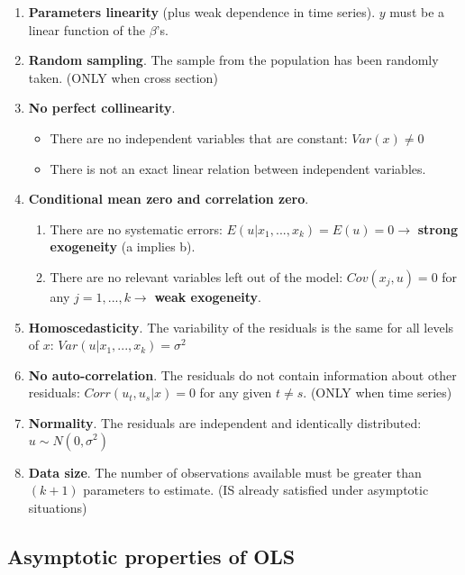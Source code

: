 \documentclass[10pt, a4paper, landscape]{extarticle}
\begin{document}
\begin{multicols}{3}
\begin{enumerate}[leftmargin=*]
\item \textbf{Parameters linearity} (plus weak dependence in time series). $y$ must be a linear function of the $\beta$'s.
\item \textbf{Random sampling}. The sample from the population has been randomly taken. (ONLY when cross section)
\item \textbf{No perfect collinearity}.
\begin{itemize}[leftmargin=*]
\item There are no independent variables that are constant: $Var(x) \neq 0$
\item There is not an exact linear relation between independent variables.
\end{itemize}
\item \textbf{Conditional mean zero and correlation zero}.
\begin{enumerate}[leftmargin=*, label=\alph*.]
\item There are no systematic errors: $E(u | x_1, ..., x_k) = E(u) = 0 \rightarrow$ \textbf{strong exogeneity} (a implies b).
\item There are no relevant variables left out of the model: $Cov(x_j , u) = 0$ for any $j = 1, ..., k \rightarrow$ \textbf{weak exogeneity}.
\end{enumerate}
\item \textbf{Homoscedasticity}. The variability of the residuals is the same for all levels of $x$: $Var(u | x_1, ..., x_k) = \sigma^2$
\item \textbf{No auto-correlation}. The residuals do not contain information about other residuals: $Corr(u_t, u_s | x) = 0$ for any given $t \neq s$. (ONLY when time series)
\item \textbf{Normality}. The residuals are independent and identically distributed: $u \sim N(0,\sigma^2)$
\item \textbf{Data size}. The number of observations available must be greater than $(k + 1)$ parameters to estimate. (IS already satisfied under asymptotic situations)
\end{enumerate}

\subsection*{Asymptotic properties of OLS}


\end{multicols}
\end{document}
